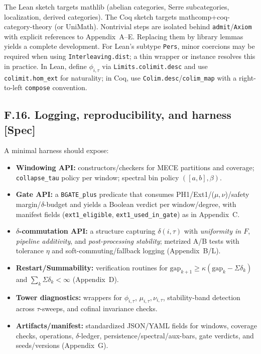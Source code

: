 \documentclass[11pt]{article}
\numberwithin{equation}{section}
\theoremstyle{plain}
\theoremstyle{definition}
\theoremstyle{remark}
\theoremstyle{plain}
\theoremstyle{definition}
\numberwithin{equation}{section}
\theoremstyle{definition}
\numberwithin{equation}{section}
\theoremstyle{plain}
\theoremstyle{definition}
\theoremstyle{remark}
\begin{document}
The Lean sketch targets \textsf{mathlib} (abelian categories, Serre subcategories, localization, derived categories).
The Coq sketch targets \textsf{mathcomp}+\textsf{coq-category-theory} (or \textsf{UniMath}). Nontrivial steps are
isolated behind \texttt{admit}/\texttt{Axiom} with explicit references to Appendix~A–E.
Replacing them by library lemmas yields a complete development.
For Lean’s subtype \texttt{Pers}, minor coercions may be required when using \texttt{Interleaving.dist};
a thin wrapper or instance resolves this in practice.
In Lean, define \(\phi_{i,\tau}\) via \texttt{Limits.colimit.desc} and use \texttt{colimit.hom\_ext} for naturality;
in Coq, use \texttt{Colim.desc}/\texttt{colim\_map} with a right-to-left \texttt{compose} convention.

\subsection*{F.16. Logging, reproducibility, and harness [Spec]}

A minimal harness should expose:
\begin{itemize}
  \item \textbf{Windowing API:} constructors/checkers for MECE partitions and coverage; \texttt{collapse\_tau} policy per window; spectral bin policy \(([a,b],\beta)\).
  \item \textbf{Gate API:} a \texttt{BGATE\_plus} predicate that consumes PH1/Ext1/(\(\mu,\nu\))/safety margin/\(\delta\)-budget and yields a Boolean verdict per window/degree, with manifest fields (\texttt{ext1\_eligible}, \texttt{ext1\_used\_in\_gate}) as in Appendix~C.
  \item \textbf{\(\delta\)-commutation API:} a structure capturing \(\delta(i,\tau)\) with \emph{uniformity in \(F\)}, \emph{pipeline additivity}, and \emph{post-processing stability}; metrized A/B tests with tolerance \(\eta\) and soft-commuting/fallback logging (Appendix~B/L).
  \item \textbf{Restart/Summability:} verification routines for \(\mathrm{gap}_{k+1}\ge \kappa(\mathrm{gap}_k-\Sigma\delta_k)\) and \(\sum_k\Sigma\delta_k<\infty\) (Appendix~D).
  \item \textbf{Tower diagnostics:} wrappers for \(\phi_{i,\tau}\), \(\mu_{i,\tau},\nu_{i,\tau}\), stability-band detection across \(\tau\)-sweeps, and cofinal invariance checks.
  \item \textbf{Artifacts/manifest:} standardized JSON/YAML fields for windows, coverage checks, operations, \(\delta\)-ledger, persistence/spectral/aux-bars, gate verdicts, and seeds/versions (Appendix~G).
\end{itemize}
\end{document}
